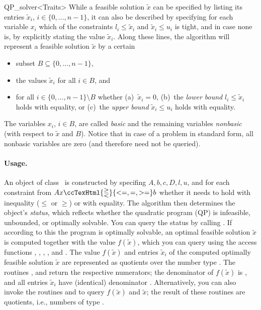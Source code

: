 \begin{ccRefClass}{QP_solver<Traits>}
While a feasible solution $\tilde{x}$ can be specified by listing its
entries $\tilde{x}_i$, $i\in\{0,\ldots,n-1\}$, it can also be
described by specifying for each variable $x_i$ which of the
constraints $l_i\leq \tilde{x}_i$ and $\tilde{x}_i\leq u_i$ is tight,
and in case none is, by explicitly stating the value $\tilde{x}_i$.
Along these lines, the algorithm will represent a feasible solution
$\tilde{x}$ by a certain
\begin{itemize}
\item subset $B\subseteq \{0,\ldots,n-1\}$,
\item the values $\tilde{x}_i$ for all $i\in B$, and
\item for all $i\in \{0,\ldots,n-1\}\setminus B$ whether
(a)~$\tilde{x}_i=0$, (b)~the \emph{lower bound} $l_i \leq \tilde{x}_i$
holds with equality, or (c)~the \emph{upper bound} $\tilde{x}_i\leq
u_i$ holds with equality.
\end{itemize}
The variables $x_i$, $i\in B$, are called \emph{basic} and the
remaining variables \emph{nonbasic} (with respect to $\tilde{x}$ and
$B$).  Notice that in case of a problem in standard form, all nonbasic
variables are zero (and therefore need not be queried).

\paragraph{Usage.}
An object of class \ccRefName\ is constructed by specifing $A, b, c,
D, l, u$, and for each constraint from $Ax \ccTexHtml{\gtreqless}{<=,=,>=} b$ whether it
needs to hold with inequality ($\leq$ or $\geq$) or with equality.
The algorithm then determines the object's \emph{status}, which
reflects whether the quadratic program (QP) is infeasible, unbounded,
or optimally solvable.  You can query the status by calling
.  If according to this the program is optimally
solvable, an optimal feasible solution $\tilde{x}$ is computed
together with the value $f(\tilde{x})$, which you can query using the
access functions ,
,
,
, and
.  The value $f(\tilde{x})$ and
entries $\tilde{x}_i$ of the computed optimally
feasible solution $\tilde{x}$ are represented as quotients over the
number type .  The routines
,
 and
 return the
respective numerators; the denominator of $f(\tilde{x})$ is
, and all entries $\tilde{x}_i$ have
(identical) denominator .
Alternatively, you can also invoke the routines  and
 to query $f(\tilde{x})$ and $\tilde{x}$;
the result of these routines are quotients, i.e., numbers of type
.



\end{ccRefClass}
